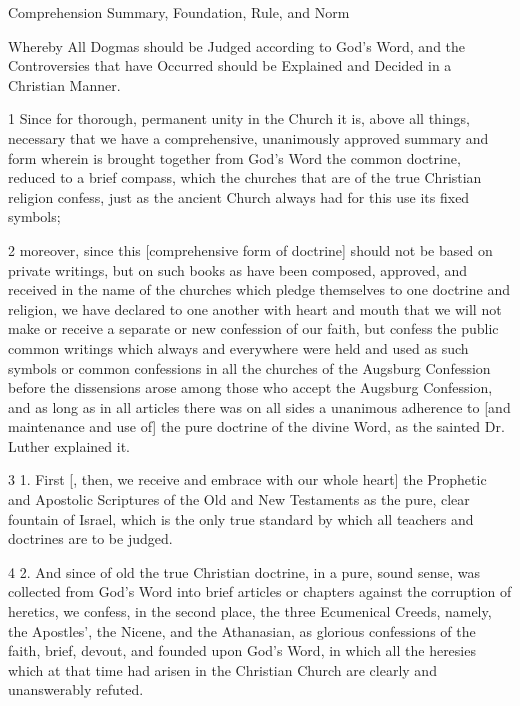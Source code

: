 Comprehension Summary, Foundation, Rule, and Norm

Whereby All Dogmas should be Judged according to God’s Word, and the Controversies that have Occurred should be Explained and Decided in a Christian Manner.

1 Since for thorough, permanent unity in the Church it is, above all things, necessary that we have a comprehensive, unanimously approved summary and form wherein is brought together from God’s Word the common doctrine, reduced to a brief compass, which the churches that are of the true Christian religion confess, just as the ancient Church always had for this use its fixed symbols;

2 moreover, since this [comprehensive form of doctrine] should not be based on private writings, but on such books as have been composed, approved, and received in the name of the churches which pledge themselves to one doctrine and religion, we have declared to one another with heart and mouth that we will not make or receive a separate or new confession of our faith, but confess the public common writings which always and everywhere were held and used as such symbols or common confessions in all the churches of the Augsburg Confession before the dissensions arose among those who accept the Augsburg Confession, and as long as in all articles there was on all sides a unanimous adherence to [and maintenance and use of] the pure doctrine of the divine Word, as the sainted Dr. Luther explained it.

3 1. First [, then, we receive and embrace with our whole heart] the Prophetic and Apostolic Scriptures of the Old and New Testaments as the pure, clear fountain of Israel, which is the only true standard by which all teachers and doctrines are to be judged.

4 2. And since of old the true Christian doctrine, in a pure, sound sense, was collected from God’s Word into brief articles or chapters against the corruption of heretics, we confess, in the second place, the three Ecumenical Creeds, namely, the Apostles’, the Nicene, and the Athanasian, as glorious confessions of the faith, brief, devout, and founded upon God’s Word, in which all the heresies which at that time had arisen in the Christian Church are clearly and unanswerably refuted.

